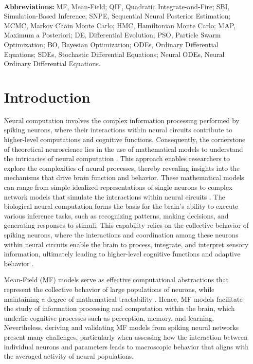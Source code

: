 \documentclass[12pt]{article}
\begin{document}
%
\ \vspace{-0mm}\\
%
{\bf Abbreviations:} MF, Mean-Field; QIF, Quadratic Integrate-and-Fire; SBI, Simulation-Based Inference;  SNPE, Sequential Neural Posterior Estimation; MCMC, Markov Chain Monte Carlo; HMC, Hamiltonian Monte Carlo; MAP, Maximum a Posteriori; DE, Differential Evolution; PSO, Particle Swarm Optimization; BO, Bayesian Optimization; ODEs, Ordinary Differential Equations; SDEs, Stochastic Differential Equations; Neural ODEs, Neural Ordinary Differential Equations.

\section{Introduction}
\label{Introduction}

Neural computation involves the complex information processing performed by spiking neurons, where their interactions within neural circuits contribute to higher-level computations and cognitive functions. Consequently, the cornerstone of theoretical neuroscience lies in the use of mathematical models to understand the intricacies of neural computation \citep{Dayan2005, Hertz2018}. This approach enables researchers to explore the complexities of neural processes, thereby revealing insights into the mechanisms that drive brain function and behavior. These mathematical models can range from simple idealized representations of single neurons \citep{Hopfield1982, Izhikevich2003} to complex network models that simulate the interactions within neural circuits \citep{Marder1998, Sussillo2014, Leary2015,  Bittner2021}. 
The biological neural computation forms the basis for the brain's ability to execute various inference tasks, such as recognizing patterns, making decisions, and generating responses to stimuli. This capability relies on the collective behavior of spiking neurons, where the interactions and coordination among these neurons within neural circuits enable the brain to process, integrate, and interpret sensory information, ultimately leading to higher-level cognitive functions and adaptive behavior \citep{Kandel2000, Gerstner2014, Friston2009, Friston2017}. 


Mean-Field (MF) models serve as effective computational abstractions that represent the collective behavior of large populations of neurons, while maintaining a degree of mathematical tractability \citep{Amari1977, Wilson1973, Jirsa1996, David2003, Deco2008, Hutt2015, Coombes2018, Bandyopadhyay2021, Cook2022}. Hence,  MF models facilitate the study of information processing and computation within the brain, which underlie cognitive processes such as perception, memory, and learning. Nevertheless, deriving and validating MF models from spiking neural networks present many challenges, particularly when assessing how the interaction between individual neurons and parameters leads to macroscopic behavior that aligns with the averaged activity of neural populations.
\end{document}
